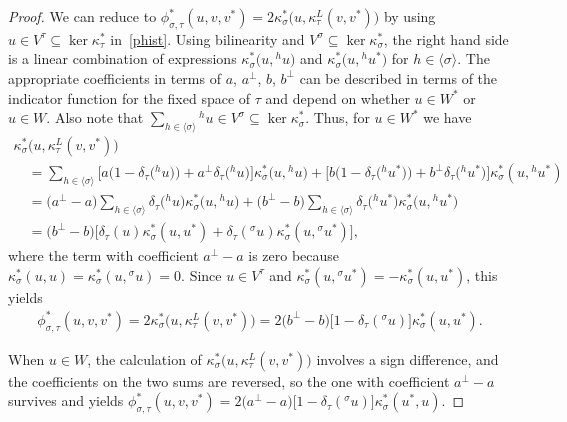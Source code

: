 \documentclass[pdftex]{sigma}
\numberwithin{equation}{section}
\newcommand{\actby}[1]{{}^{#1}}
\newcommand{\actbylessspace}[1]{{}^{#1}\!}
\begin{document}
\begin{proof}
We can reduce to
$\phi^*_{\sigma,\tau}(u,v,v^*)=2\kappa^*_{\sigma}\big(u,\kappa^L_{\tau}(v,v^*)\big)$
by using $u \in V^{\tau} \subseteq \ker\kappa^*_{\tau}$ in~\eqref{phist}.
Using bilinearity and $V^{\sigma} \subseteq \ker \kappa^*_{\sigma}$, the right hand
side is a linear combination of expressions $\kappa^*_{\sigma}\big(u,\actby{h}u\big)$ and
$\kappa^*_{\sigma}\big(u,\actby{h}u^*\big)$ for $h \in \langle \sigma \rangle$.
The appropriate coefficients in terms of $a$, $a^\perp$, $b$, $b^\perp$ can be described
in terms of the indicator function for the fixed space of $\tau$ and depend on
whether $u \in W^*$ or~$u \in W$.
Also note that $\sum_{h \in \langle \sigma \rangle} \actby{h}u \in V^{\sigma} \subseteq \ker \kappa^*_{\sigma}$.
Thus, for $u \in W^*$ we have
\begin{gather*}
\kappa^*_{\sigma}\big(u,\kappa^L_{\tau}(v,v^*)\big)
\\ \quad
{}=\sum\limits_{h \in \langle \sigma \rangle} \!\! \big[a\big(1-\delta_{\tau}\big(\actby{h}u\big)\big)+a^\perp\delta_{\tau}\big(\actby{h}u\big)\big]\kappa^*_{\sigma}\big(u,\actby{h}u\big) +\big[b\big(1-\delta_{\tau}\big(\actby{h}u^*\big)\big)+b^\perp\delta_{\tau}\big(\actby{h}u^*\big)\big] \kappa^*_{\sigma}(u,\actby{h}u^*)
\\ \quad
{}=\big(a^\perp-a\big)\sum\limits_{h \in \langle \sigma \rangle}
\delta_{\tau}\big(\actby{h}u\big)\kappa^*_{\sigma}\big(u,\actby{h}u\big)
+\big(b^\perp-b\big)\sum\limits_{h \in \langle \sigma \rangle}
\delta_{\tau}\big(\actby{h}u^*\big)\kappa^*_{\sigma}\big(u,\actby{h}u^*\big)
\\ \quad
{}=\big(b^\perp-b\big)\big[\delta_{\tau}(u)\kappa^*_{\sigma}(u,u^*)
+\delta_{\tau}(\actbylessspace{\sigma}u)\kappa^*_{\sigma}(u,\actbylessspace{\sigma}u^*)\big],
\end{gather*}
where the term with coefficient $a^\perp-a$ is zero because $\kappa^*_{\sigma}(u,u)=\kappa^*_{\sigma}(u,\actbylessspace{\sigma}u)=0$.
Since $u \in V^{\tau}$ and $\kappa^*_{\sigma}(u,\actbylessspace{\sigma}u^*)=-\kappa^*_{\sigma}(u,u^*)$, this yields
\begin{gather*} \phi^*_{\sigma,\tau}(u,v,v^*)=2\kappa^*_{\sigma}\big(u,\kappa^L_{\tau}(v,v^*)\big)=2\big(b^\perp-b\big) \big[1-\delta_{\tau}(\actbylessspace{\sigma}u)\big]\kappa^*_{\sigma}(u,u^*).
\end{gather*}
	
When $u \in W$, the calculation of $\kappa^*_{\sigma}\big(u,\kappa^L_{\tau}(v,v^*)\big)$
involves a sign difference, and the coefficients on the two sums
are reversed, so the one with coefficient $a^\perp-a$ survives and yields
$\phi^*_{\sigma,\tau}(u,v,v^*)=2\big(a^\perp-a\big)\big[1-\delta_{\tau}(\actbylessspace{\sigma}u)\big]\kappa^*_{\sigma}(u^*,u)$.


\end{proof}
\end{document}

